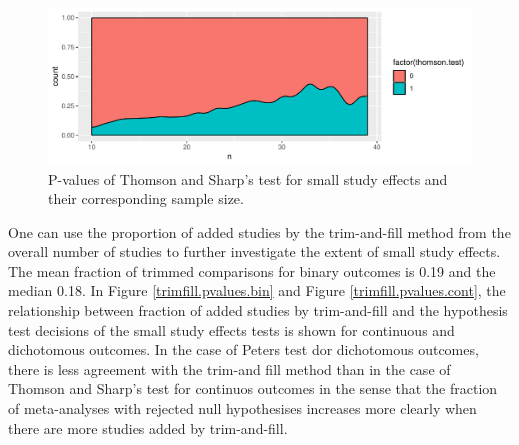 \documentclass[11pt,a4paper,twoside]{book}\usepackage[]{graphicx}\usepackage[]{color}
\newenvironment{knitrout}{}{} %
\begin{document}
\begin{figure}
\begin{knitrout}
\color{fgcolor}

{\centering \includegraphics[width=\textwidth-3cm]{figure/ch02_figunnamed-chunk-24-1} 

}



\end{knitrout}
\caption{P-values of Thomson and Sharp's test for small study effects and their corresponding sample size.}
\label{pvalues.samplesize}
\end{figure}



\vspace{0mm}
One can use the proportion of added studies by the trim-and-fill method from the overall number of studies to further investigate the extent of small study effects. The mean fraction of trimmed comparisons for binary outcomes is 0.19 and the median 0.18. 
In Figure \ref{trimfill.pvalues.bin} and Figure \ref{trimfill.pvalues.cont}, the relationship between fraction of added studies by trim-and-fill and the hypothesis test decisions of the small study effects tests is shown for continuous and dichotomous outcomes. In the case of Peters test dor dichotomous outcomes, there is less agreement with the trim-and fill method than in the case of Thomson and Sharp's test for continuos outcomes in the sense that the fraction of meta-analyses with rejected null hypothesises increases more clearly when there are more studies added by trim-and-fill. 
\end{document}

